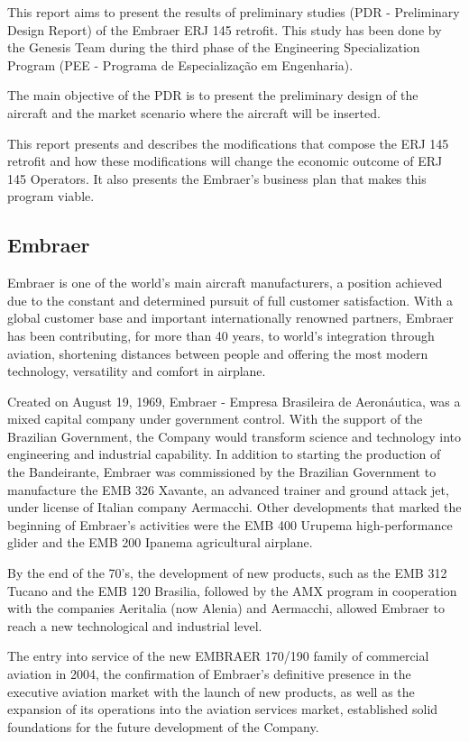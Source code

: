 
This report aims to present the results of preliminary studies (PDR - Preliminary Design Report) of the Embraer ERJ 145 retrofit. This study has been done by the Genesis Team during the third phase of the Engineering Specialization Program (PEE - Programa de Especializa\c c\~ ao em Engenharia).

The main objective of the PDR is to present the preliminary design of the aircraft and the market scenario where the aircraft will be inserted.

This report presents and describes the modifications that compose the ERJ 145 retrofit and how these modifications will change the economic outcome of ERJ 145 Operators. It also presents the Embraer's business plan that makes this program viable.

\subsection{Embraer}
Embraer is one of the world's main aircraft manufacturers, a position achieved due to the constant and determined pursuit of full customer satisfaction. With a global customer base and important internationally renowned partners, Embraer has been contributing, for more than 40 years, to world's integration through aviation, shortening distances between people and offering the most modern technology, versatility and comfort in airplane.

Created on August 19, 1969, Embraer - Empresa Brasileira de Aeron\' autica, was a mixed capital company under government control. With the support of the Brazilian Government, the Company would transform science and technology into engineering and industrial capability. In addition to starting the production of the Bandeirante, Embraer was commissioned by the Brazilian Government to manufacture the EMB 326 Xavante, an advanced trainer and ground attack jet, under license of Italian company Aermacchi. Other developments that marked the beginning of Embraer's activities were the EMB 400 Urupema high-performance glider and the EMB 200 Ipanema agricultural airplane.

By the end of the 70's, the development of new products, such as the EMB 312 Tucano and the EMB 120 Brasilia, followed by the AMX program in cooperation with the companies Aeritalia (now Alenia) and Aermacchi, allowed Embraer to reach a new technological and industrial level.

The entry into service of the new EMBRAER 170/190 family of commercial aviation in 2004, the confirmation of Embraer's definitive presence in the executive aviation market with the launch of new products, as well as the expansion of its operations into the aviation services market, established solid foundations for the future development of the Company.

